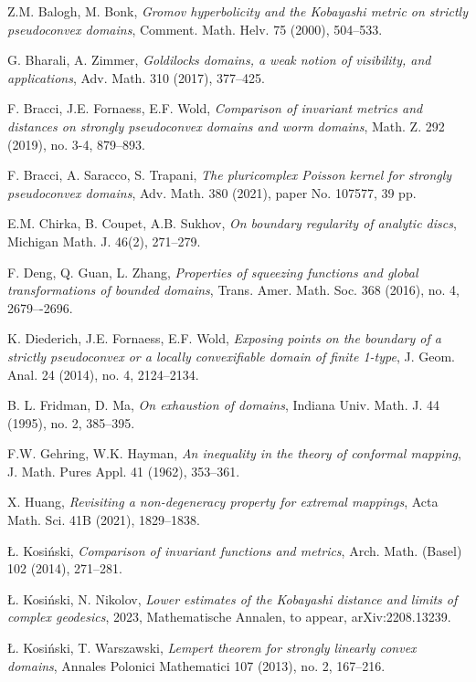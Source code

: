 \documentclass[a4paper,12pt]{amsart}
\theoremstyle{remark}\newtheorem{remark}[theorem]{Remark}
\begin{document}
	\begin{thebibliography}{}
		
 Z.M. Balogh, M. Bonk, {\it Gromov hyperbolicity and the Kobayashi metric on strictly pseudoconvex domains}, Comment. Math. Helv. 75 (2000), 504--533.

  G. Bharali, A. Zimmer, {\it Goldilocks domains, a weak notion of visibility, and applications},
Adv. Math. 310 (2017), 377--425.

   F. Bracci, J.E. Fornaess, E.F. Wold,  {\it Comparison of invariant metrics and distances on strongly pseudoconvex domains and worm domains}, Math. Z. 292 (2019), no. 3-4, 879--893.

   F. Bracci, A. Saracco, S. Trapani,  {\it The pluricomplex Poisson kernel for strongly pseudoconvex domains},
Adv. Math. 380 (2021), paper No. 107577, 39 pp.

 E.M. Chirka, B. Coupet, A.B. Sukhov, {\it On boundary regularity of analytic discs},
Michigan Math. J. 46(2), 271--279.

 F. Deng, Q. Guan, L. Zhang, {\it Properties of squeezing functions and global transformations of bounded domains}, Trans. Amer. Math. Soc. 368 (2016), no. 4, 2679–-2696. 
  		
    K. Diederich, J.E. Fornaess, E.F. Wold, {\it Exposing points on the boundary of a strictly pseudoconvex or a locally convexifiable domain of finite 1-type}, J. Geom. Anal. 24 (2014), no. 4, 2124--2134.

  B. L. Fridman, D. Ma, {\it On exhaustion of domains}, Indiana Univ. Math. J. 44 (1995), no. 2, 385--395.

   F.W.  Gehring, W.K. Hayman, 
{\it An inequality in the theory of conformal mapping},
J. Math. Pures Appl.  41 (1962), 353--361. 


 X. Huang, {\it Revisiting a non-degeneracy property for extremal mappings}, Acta Math. Sci. 41B (2021), 1829--1838.
  
 \L. Kosi\'nski, {\it Comparison of invariant functions and metrics}, Arch. Math. (Basel) 102 (2014), 271--281.

 \L. Kosi\'nski, N. Nikolov, {\it  Lower estimates of the Kobayashi distance and limits of complex geodesics}, 2023, Mathematische Annalen, to appear, arXiv:2208.13239.

 \L. Kosi\'nski, T. Warszawski, {\it Lempert theorem for strongly linearly convex domains}, Annales Polonici Mathematici  107 (2013), no. 2, 167--216.


\end{thebibliography}
\end{document}
